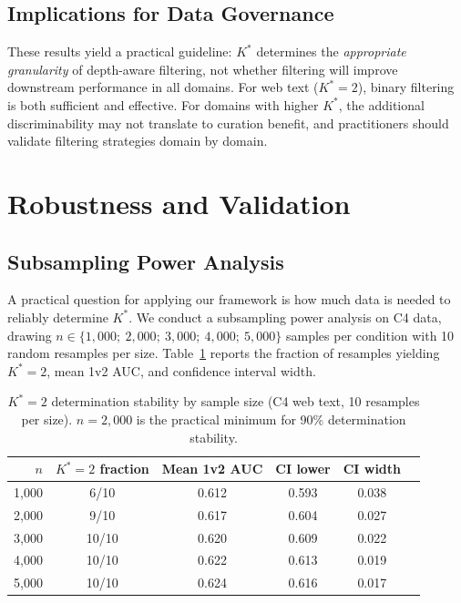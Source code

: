 \documentclass[11pt,a4paper]{article}
\begin{document}
\subsection{Implications for Data Governance}

These results yield a practical guideline: $K^*$ determines the \emph{appropriate granularity} of depth-aware filtering, not whether filtering will improve downstream performance in all domains. For web text ($K^*\!=\!2$), binary filtering is both sufficient and effective. For domains with higher $K^*$, the additional discriminability may not translate to curation benefit, and practitioners should validate filtering strategies domain by domain.


\section{Robustness and Validation}

\subsection{Subsampling Power Analysis}
\label{sec:power}

A practical question for applying our framework is how much data is needed to reliably determine $K^*$. We conduct a subsampling power analysis on C4 data, drawing $n \in \{1{,}000;\ 2{,}000;\ 3{,}000;\ 4{,}000;\ 5{,}000\}$ samples per condition with 10 random resamples per size. Table~\ref{tab:power} reports the fraction of resamples yielding $K^*\!=\!2$, mean 1v2 AUC, and confidence interval width.

\begin{table}[t]
\centering
\small
\caption{$K^*\!=\!2$ determination stability by sample size (C4 web text, 10 resamples per size). $n\!=\!2{,}000$ is the practical minimum for 90\% determination stability.}
\label{tab:power}
\begin{tabular}{rccccc}
\toprule
$n$ & $K^*\!=\!2$ fraction & Mean 1v2 AUC & CI lower & CI width \\
\midrule
1{,}000 & 6/10 & 0.612 & 0.593 & 0.038 \\
2{,}000 & 9/10 & 0.617 & 0.604 & 0.027 \\
3{,}000 & 10/10 & 0.620 & 0.609 & 0.022 \\
4{,}000 & 10/10 & 0.622 & 0.613 & 0.019 \\
5{,}000 & 10/10 & 0.624 & 0.616 & 0.017 \\
\bottomrule
\end{tabular}
\end{table}
\end{document}
